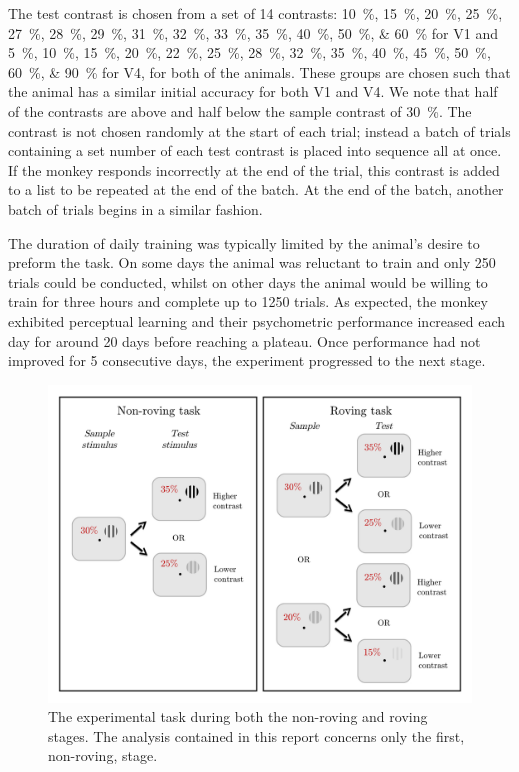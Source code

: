 The test contrast is chosen from a set of 14 contrasts:
\SIlist[list-units = brackets]{10;15;20;25;27;28;29;31;32;33;35;40;50;60}{\percent} for \ac{V1} and
\SIlist[list-units = brackets]{5;10;15;20;22;25;28;32;35;40;45;50;60;90}{\percent} for \ac{V4},
for both of the animals.
These groups are chosen such that the animal has a similar initial accuracy for both \ac{V1} and \ac{V4}.
We note that half of the contrasts are above and half below the sample contrast of \SI{30}{\percent}.
The contrast is not chosen randomly at the start of each trial; instead a batch of trials containing a set number of each test contrast is placed into sequence all at once.
If the monkey responds incorrectly at the end of the trial, this contrast is added to a list to be repeated at the end of the batch.
At the end of the batch, another batch of trials begins in a similar fashion.

The duration of daily training was typically limited by the animal's desire to preform the task.
On some days the animal was reluctant to train and only 250 trials could be conducted, whilst on other days the animal would be willing to train for three hours and complete up to 1250 trials.
As expected, the monkey exhibited perceptual learning and their psychometric performance increased each day for around 20 days before reaching a plateau.
Once performance had not improved for 5 consecutive days, the experiment progressed to the next stage.


\begin{figure}[htbp]
\begin{center}
\includegraphics[width=0.8\linewidth]{figs/task/PLtask2.pdf}
\end{center}
\caption{The experimental task during both the non-roving and roving stages.
The analysis contained in this report concerns only the first, non-roving, stage.}
\label{fig:pltask2}
\end{figure}

